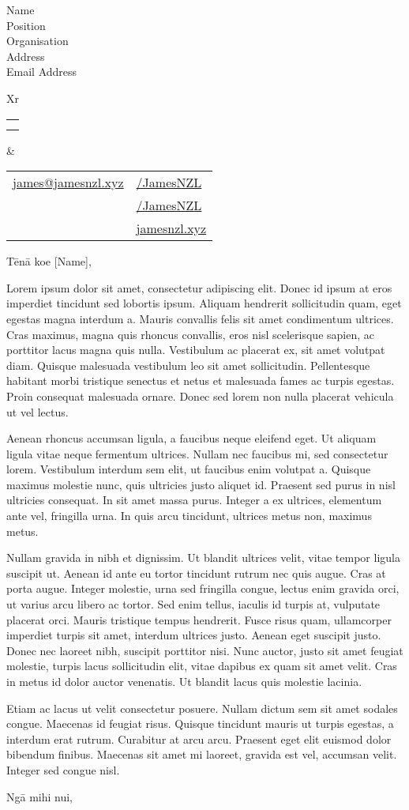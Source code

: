 \documentclass[12pt,a4paper]{letter}[leftmargin=*]
\date{\today}
\makeatletter
\def \fullname {James Bao}
\def \subtitle {}
\def \emailicon {\faAt}
\def \emaillink {mailto:james@jamesnzl.xyz}
\def \emailtext {james@jamesnzl.xyz}
\def \phoneicon {\faMobile}
\def \phonetext {+64 22 410 1580}
\def \addressicon {\faMapMarker*}
\def \addresstext {Auckland, New Zealand}
\def \linkedinicon {\faLinkedin}
\def \linkedinlink {https://www.linkedin.com/in/jamesnzl/}
\def \linkedintext {/JamesNZL}
\def \githubicon {\faGithub}
\def \githublink {https://github.com/jamesnzl}
\def \githubtext {/JamesNZL}
\def \websiteicon {\faGlobe}
\def \websitelink {https://jamesnzl.xyz/}
\def \websitetext {jamesnzl.xyz}
\def \headertype {\doublecol} %
\def \email {\emailicon \hspace{3pt}\href{\emaillink}{\emailtext}}
\def \phone {\phoneicon \hspace{3pt}{ \phonetext}}
\def \address {\addressicon \hspace{3pt}{\addresstext}}
\def \linkedin {\linkedinicon \hspace{3pt}\href{\linkedinlink}{\linkedintext}}
\def \github {\githubicon \hspace{3pt}\href{\githublink}{\githubtext}}
\def \website {\websiteicon \hspace{3pt}\href{\websitelink}{\websitetext}}
\newcommand{\doublecol}[6]{
  \begin{tabularx}{\textwidth}{Xr}
    {
      \begin{tabular}[c]{l}
        \fontsize{35}{45}\selectfont{\color{primary}{{\textbf{\fullname}}}} \\
        {\textit{\subtitle}} %
      \end{tabular}
    } & {
      \begin{tabular}[c]{l@{\hspace{1.5em}}l}
        {\small#4} & {\small#1} \\
        {\small#5} & {\small#2} \\
        {\small#6} & {\small#3}
      \end{tabular}
    }
  \end{tabularx}
}
\newcommand{\singlecol}[6]{
  \begin{tabularx}{\textwidth}{Xr}
    {
      \begin{tabular}[b]{l}
        \fontsize{35}{45}\selectfont{\color{primary}{{\textbf{\fullname}}}} \\
        {\textit{\subtitle}} %
      \end{tabular}
    } & {
      \begin{tabular}[c]{l}
        {\small#1} \\
        {\small#2} \\
        {\small#3} \\
        {\small#4} \\
        {\small#5} \\
        {\small#6}
      \end{tabular}
    }
  \end{tabularx}
}
\makeatother
\begin{document}
\begin{letter}{
    Name\\
    Position\\
    Organisation\\
    Address\\
    Email Address
  }


  \begin{flushleft}
    \headertype{\linkedin}{\github}{\website}{\email}{\phone}{\address} %
  \end{flushleft}

  \opening{Tēnā koe [Name],}

  Lorem ipsum dolor sit amet, consectetur adipiscing elit.
  Donec id ipsum at eros imperdiet tincidunt sed lobortis ipsum.
  Aliquam hendrerit sollicitudin quam, eget egestas magna interdum a.
  Mauris convallis felis sit amet condimentum ultrices.
  Cras maximus, magna quis rhoncus convallis, eros nisl scelerisque sapien, ac porttitor lacus magna quis nulla.
  Vestibulum ac placerat ex, sit amet volutpat diam.
  Quisque malesuada vestibulum leo sit amet sollicitudin.
  Pellentesque habitant morbi tristique senectus et netus et malesuada fames ac turpis egestas.
  Proin consequat malesuada ornare.
  Donec sed lorem non nulla placerat vehicula ut vel lectus.

  Aenean rhoncus accumsan ligula, a faucibus neque eleifend eget.
  Ut aliquam ligula vitae neque fermentum ultrices.
  Nullam nec faucibus mi, sed consectetur lorem.
  Vestibulum interdum sem elit, ut faucibus enim volutpat a.
  Quisque maximus molestie nunc, quis ultricies justo aliquet id.
  Praesent sed purus in nisl ultricies consequat.
  In sit amet massa purus.
  Integer a ex ultrices, elementum ante vel, fringilla urna.
  In quis arcu tincidunt, ultrices metus non, maximus metus.

  Nullam gravida in nibh et dignissim.
  Ut blandit ultrices velit, vitae tempor ligula suscipit ut.
  Aenean id ante eu tortor tincidunt rutrum nec quis augue.
  Cras at porta augue.
  Integer molestie, urna sed fringilla congue, lectus enim gravida orci, ut varius arcu libero ac tortor.
  Sed enim tellus, iaculis id turpis at, vulputate placerat orci.
  Mauris tristique tempus hendrerit.
  Fusce risus quam, ullamcorper imperdiet turpis sit amet, interdum ultrices justo.
  Aenean eget suscipit justo.
  Donec nec laoreet nibh, suscipit porttitor nisi.
  Nunc auctor, justo sit amet feugiat molestie, turpis lacus sollicitudin elit, vitae dapibus ex quam sit amet velit.
  Cras in metus id dolor auctor venenatis.
  Ut blandit lacus quis molestie lacinia.

  Etiam ac lacus ut velit consectetur posuere.
  Nullam dictum sem sit amet sodales congue.
  Maecenas id feugiat risus.
  Quisque tincidunt mauris ut turpis egestas, a interdum erat rutrum.
  Curabitur at arcu arcu.
  Praesent eget elit euismod dolor bibendum finibus.
  Maecenas sit amet mi laoreet, gravida est vel, accumsan velit.
  Integer sed congue nisl.

  \closing{Ngā mihi nui,}

\end{letter}
\end{document}
